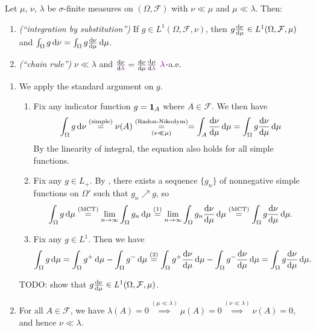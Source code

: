 \begin{enumerate}
Let \(\mu\), \(\nu\), \(\lambda\) be \(\sigma\)-finite measures on
\((\Omega,\mathcal{F})\) with \(\nu\ll\mu\) and \(\mu\ll\lambda\). Then:
\begin{enumerate}
\item\label{it:rn-deriv-int-sub} \emph{(``integration by substitution'')} If \(g\in
L^{1}(\Omega,\mathcal{F},\nu)\), then \(g\odv{\nu}{\mu}\in
L^{1}(\Omega,\mathcal{F},\mu)\) and
\(\int_{\Omega}^{}g\odif{\nu}=\int_{\Omega}^{}g\odv{\nu}{\mu}\odif{\mu}\).
\item\label{it:rn-deriv-chain-rule} \emph{(``chain rule'')} \(\nu\ll\lambda\) and
\(\odv{\nu}{\vc{\lambda}}=\odv{\nu}{\mu}\odv{\mu}{\vc{\lambda}}\) \(\vc{\lambda}\)-a.e.
\end{enumerate}
\begin{pf}
\begin{enumerate}
\item We apply the standard argument on \(g\).
\begin{enumerate}[label={(\arabic*)}]
\item Fix any indicator function \(g=\mathbf{1}_{A}\) where \(A\in\mathcal{F}\). We
then have
\[
\int_{\Omega}^{}g\odif{\nu}\overset{\text{(simple)}}{=}\nu(A)\underset{(\nu\ll\mu)}{\overset{\text{(Radon-Nikodym)}}{=}}
=\int_{A}^{}\odv{\nu}{\mu}\odif{\mu} =\int_{\Omega}^{}g\odv{\nu}{\mu}\odif{\mu}
\]
By the linearity of integral, the equation also holds for all simple functions.
\item Fix any \(g\in L_{+}\). By , there exists a sequence
\(\{g_n\}\) of nonnegative simple functions on \(\Omega'\) such that
\(g_n\nearrow g\), so
\[
\int_{\Omega}^{}g\odif{\mu}\overset{\text{(MCT)}}{=}
\lim_{n\to\infty}\int_{\Omega}^{}g_n\odif{\mu}
\overset{(1)}{=}\lim_{n\to\infty}\int_{\Omega}^{}g_n\odv{\nu}{\mu}\odif{\mu}
\overset{\text{(MCT)}}{=}\int_{\Omega}^{}g\odv{\nu}{\mu}\odif{\mu}.
\]
\item Fix any \(g\in L^{1}\). Then we have
\[
\int_{\Omega}^{}g\odif{\mu}=\int_{\Omega}^{}g^{+}\odif{\mu}-\int_{\Omega}^{}g^{-}\odif{\mu}
\overset{(2)}{=}\int_{\Omega}^{}g^{+}\odv{\nu}{\mu}\odif{\mu}
-\int_{\Omega}^{}g^{-}\odv{\nu}{\mu}\odif{\mu}
=\int_{\Omega}^{}g\odv{\nu}{\mu}\odif{\mu}.
\]
\end{enumerate}
TODO: show that \(g\odv{\nu}{\mu}\in L^{1}(\Omega,\mathcal{F},\mu)\).
\item For all \(A\in\mathcal{F}\), we have
\(\lambda(A)=0\overset{(\mu\ll\lambda)}{\implies }\mu(A)=0
\overset{(\nu\ll\lambda)}{\implies }\nu(A)=0\), and hence \(\nu\ll\lambda\).


\end{enumerate}
\end{pf}
\end{enumerate}
